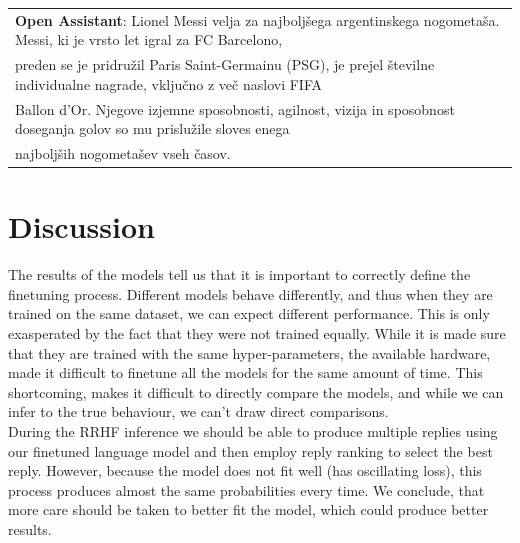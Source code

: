 \documentclass[fleqn,moreauthors,10pt]{ds_report}
\begin{document}
\begin{table}[hbt]
{\begin{tabular}{l}
            \textbf{Open Assistant}: Lionel Messi velja za najboljšega argentinskega nogometaša. Messi, ki je vrsto let igral za FC Barcelono,\\ preden se je pridružil Paris Saint-Germainu (PSG), je prejel številne individualne nagrade, vključno z več naslovi FIFA\\ Ballon d'Or. Njegove izjemne sposobnosti, agilnost, vizija in sposobnost doseganja golov so mu prislužile sloves enega\\ najboljših nogometašev vseh časov.

            
            
    	\end{tabular}
        }
    	\label{tab:results_qualitative}
    \end{table}


\section*{Discussion}
    The results of the models tell us that it is important to correctly define the finetuning process. Different models behave differently, and thus when they are trained on the same dataset, we can expect different performance. This is only exasperated by the fact that they were not trained equally. While it is made sure that they are trained with the same hyper-parameters, the available hardware, made it difficult to finetune all the models for the same amount of time. This shortcoming, makes it difficult to directly compare the models, and while we can infer to the true behaviour, we can't draw direct comparisons.\\
    During the RRHF inference we should be able to produce multiple replies using our finetuned language model and then employ reply ranking to select the best reply. However, because the model does not fit well (has oscillating loss), this process produces almost the same probabilities every time. We conclude, that more care should be taken to better fit the model, which could produce better results.   

\end{document}
